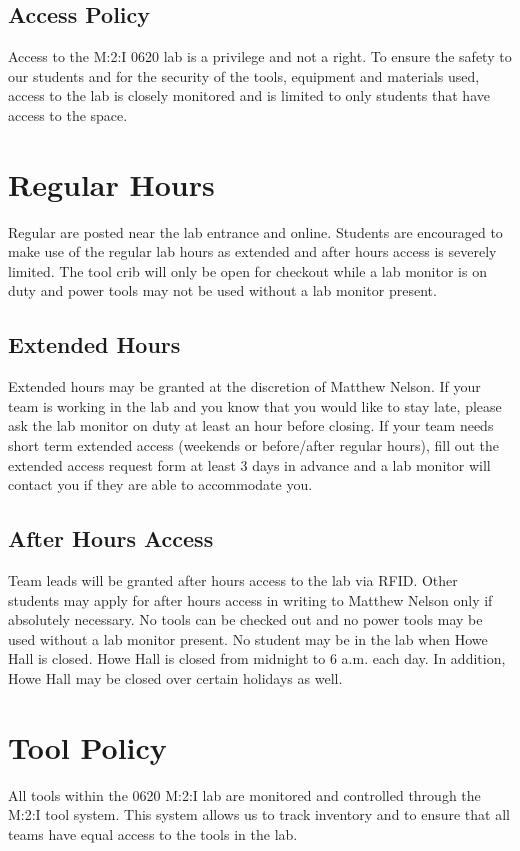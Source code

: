 \subsection{Access Policy}
Access to the M:2:I 0620 lab is a privilege and not a right.  To ensure the safety to our students and for the security of the tools, equipment and materials used, access to the lab is closely monitored and is limited to only students that have access to the space.
\section{Regular Hours}
Regular  are posted near the lab entrance and online. Students are encouraged to make use of the regular lab hours as extended and after hours access is severely limited. The tool crib will only be open for checkout while a lab monitor is on duty and power tools may not be used without a lab monitor present.


\subsection{Extended Hours}
Extended hours may be granted at the discretion of Matthew Nelson. If your team is working in the lab and you know that you would like to stay late, please ask the lab monitor on duty at least an hour before closing. If your team needs short term extended access (weekends or before/after regular hours), fill out the extended access request form at least 3 days in advance and a lab monitor will contact you if they are able to accommodate you.
\subsection{After Hours Access}
Team leads will be granted after hours access to the lab via RFID. Other students may apply for after hours access in writing to Matthew Nelson only if absolutely necessary. No tools can be checked out and no power tools may be used without a lab monitor present.  No student may be in the lab when Howe Hall is closed.  Howe Hall is closed from midnight to 6 a.m. each day.  In addition, Howe Hall may be closed over certain holidays as well.

\section{Tool Policy}
All tools within the 0620 M:2:I lab are monitored and controlled through the M:2:I tool system.  This system allows us to track inventory and to ensure that all teams have equal access to the tools in the lab.  
